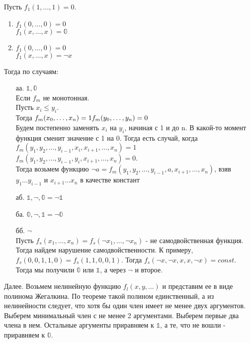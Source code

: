 \documentclass[12pt]{article}
\begin{document}
Пусть $f_1(1,\ldots,1) = 0$.
\begin{enumerate}
    \item $f_1(0,\ldots,0) = 0$\\
    $f_1(x,\ldots,x) = \mathbb{0}$
    \item $f_1(0,\ldots,0) = 0$\\
    $f_1(x,\ldots,x) = \lnot x$
\end{enumerate}
Тогда по случаям:
\begin{enumerate}
    \item[аа.] $\mathbb{1},\mathbb{0}$\\
    Если $f_m$ не монотонная.\\
    Пусть $x_i\leq y_i$.\\
    Тогда $f_m(x_0,\ldots,x_n) = 1\\
    f_m(y_0,\ldots,y_n)=0$\\
    Будем постепенно заменять $x_i$ на $y_i$, начиная с 1 и до n. В какой-то момент функция сменит значение с 1 на 0. Тогда есть случай, когда \\
    $f_m(y_1,y_2,\ldots, y_{i-1}, x_i, x_{i+1}, \dots, x_n) = 1$\\
    $f_m(y_1,y_2,\ldots, y_{i-1}, y_i, x_{i+1}, \dots, x_n) = 0$.\\
    Тогда возьмем функцию $\lnot a = f_m(y_1,y_2,\ldots, y_{i-1}, a, x_{i+1}, \dots, x_n)$, взяв $y_1\ldots y_{i-1}$ и $x_{i+1}\ldots x_n$ в качестве констант
    \item[аб.] $\mathbb{1},\lnot,\mathbb{0}=\lnot\mathbb{1}$
    \item[ба.] $\mathbb{0},\lnot,\mathbb{1}=\lnot\mathbb{0}$
    \item[бб.] $\lnot$\\
    Пусть $f_s(x_1,\ldots,x_n) = f_s(\lnot x_1, \ldots, \lnot x_n)$ - не самодвойственная функция.\\
    Тогда найдем нарушение самодвойственности. К примеру, $f_s(0,0,1,1,0) = f_s(1,1,0,0,1)$.
    Тогда $f_s(\lnot x, \lnot x, x, x, \lnot x) = const$. Тогда мы получили $\mathbb{0}$ или $\mathbb{1}$, а через $\lnot$ и второе.
\end{enumerate}
Далее. Возьмем нелинейную функцию $f_l(x,y,\ldots)$ и представим ее в виде полинома Жегалкина. По теореме такой полином единственный, а из нелинейности следует, что хотя бы один член имеет не менее двух аргументов. Выберем минимальный член с не менее 2 аргументами. Выберем первые два члена в нем. Остальные аргументы приравняем к $\mathbb{1}$, а те, что не вошли - приравняем к $\mathbb{0}$.
\end{document}
